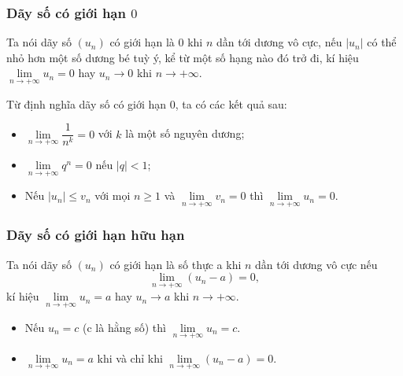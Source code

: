 \subsubsection{Dãy số có giới hạn $0$}
	\begin{dn}
		Ta nói dãy số $\left(u_{n}\right)$ có giới hạn là $0$ khi $n$ dần tới dương vô cực, nếu $\left|u_{n}\right|$ có thể nhỏ hơn một số dương bé tuỳ ý, kể từ một số hạng nào đó trở đi, kí hiệu $\lim \limits_{n \rightarrow+\infty} u_{n}=0$ hay $u_{n} \rightarrow 0$ khi $n \rightarrow+\infty$.
	\end{dn}
	Từ định nghĩa dãy số có giới hạn $0$, ta có các kết quả sau:
	\begin{itemize}
		\item $\lim \limits_{n \rightarrow+\infty} \dfrac{1}{n^{k}}=0$ với $k$ là một số nguyên dương;	
		\item $\lim \limits_{n \rightarrow+\infty} q^{n}=0$ nếu $|q|<1$;	
		\item Nếu $\left|u_{n}\right| \leq v_{n}$ với mọi $n \geq 1$ và $\lim \limits_{n \rightarrow+\infty} v_{n}=0$ thì $\lim \limits_{n \rightarrow+\infty} u_{n}=0$.	
	\end{itemize}
	\subsubsection{Dãy số có giới hạn hữu hạn}
	\begin{dn}
		Ta nói dãy số $\left(u_{n}\right)$ có giới hạn là số thực a khi $n$ dần tới dương vô cực nếu $$\lim \limits_{n \rightarrow+\infty}\left(u_{n}-a\right)=0,$$ kí hiệu $\lim \limits_{n \rightarrow+\infty} u_{n}=a$ hay $u_{n} \rightarrow a$ khi $n \rightarrow+\infty$. 
	\end{dn}
	\begin{itemize}
		\item Nếu $u_{n}=c$ (c là hằng số) thì $\lim \limits_{n \rightarrow+\infty} u_{n}=c$. 
		\item $\lim \limits_{n \rightarrow+\infty} u_{n}=a$ khi và chỉ khi $\lim \limits_{n \rightarrow+\infty}\left(u_{n}-a\right)=0$.
	\end{itemize}

